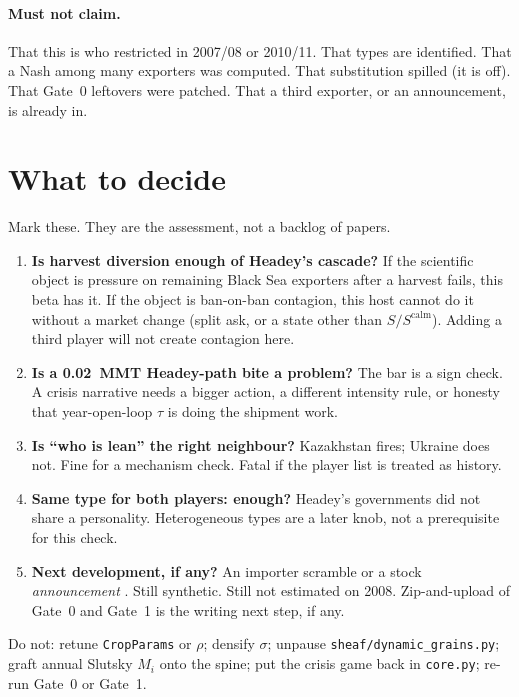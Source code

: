 \documentclass[11pt,a4paper]{article}
\begin{document}
\paragraph{Must not claim.}
That this is who restricted in 2007/08 or 2010/11. That types are
identified. That a Nash among many exporters was computed. That substitution
spilled (it is off). That Gate~0 leftovers were patched. That a third
exporter, or an announcement, is already in.

\section{What to decide}
\label{sec:decide}

Mark these. They are the assessment, not a backlog of papers.

\begin{enumerate}
\item \textbf{Is harvest diversion enough of Headey's cascade?}
      If the scientific object is pressure on remaining Black Sea exporters
      after a harvest fails, this beta has it. If the object is ban-on-ban
      contagion, this host cannot do it without a market change (split ask,
      or a state other than \(S/S^{\mathrm{calm}}\)). Adding a third player
      will not create contagion here.
\item \textbf{Is a 0.02~MMT Headey-path bite a problem?}
      The bar is a sign check. A crisis narrative needs a bigger action, a
      different intensity rule, or honesty that year-open-loop \(\tau\) is
      doing the shipment work.
\item \textbf{Is ``who is lean'' the right neighbour?}
      Kazakhstan fires; Ukraine does not. Fine for a mechanism check. Fatal
      if the player list is treated as history.
\item \textbf{Same type for both players: enough?}
      Headey's governments did not share a personality. Heterogeneous types
      are a later knob, not a prerequisite for this check.
\item \textbf{Next development, if any?}
      An importer scramble or a stock \emph{announcement}
      \citep{headey2011}. Still synthetic. Still not estimated on 2008.
      Zip-and-upload of Gate~0 and Gate~1 is the writing next step, if any.
\end{enumerate}

Do not: retune \texttt{CropParams} or \(\rho\); densify \(\sigma\); unpause
\texttt{sheaf/dynamic\_grains.py}; graft annual Slutsky \(M_i\) onto the
spine; put the crisis game back in \texttt{core.py}; re-run Gate~0 or
Gate~1.




\end{document}
